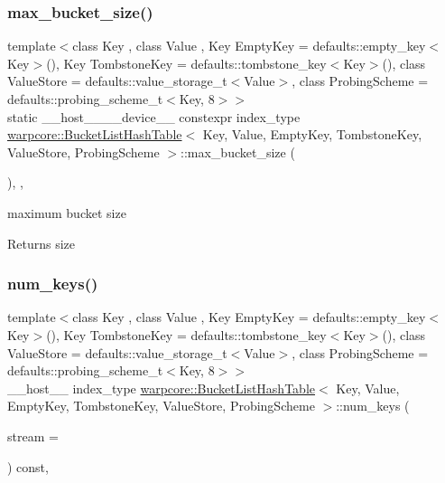 \subsubsection{\texorpdfstring{max\+\_\+bucket\+\_\+size()}{max\_bucket\_size()}}
{\footnotesize\ttfamily template$<$class Key , class Value , Key Empty\+Key = defaults\+::empty\+\_\+key$<$\+Key$>$(), Key Tombstone\+Key = defaults\+::tombstone\+\_\+key$<$\+Key$>$(), class Value\+Store  = defaults\+::value\+\_\+storage\+\_\+t$<$\+Value$>$, class Probing\+Scheme  = defaults\+::probing\+\_\+scheme\+\_\+t$<$\+Key, 8$>$$>$ \\
static \+\_\+\+\_\+host\+\_\+\+\_\+\+\_\+\+\_\+device\+\_\+\+\_\+ constexpr index\+\_\+type \hyperlink{classwarpcore_1_1BucketListHashTable}{warpcore\+::\+Bucket\+List\+Hash\+Table}$<$ Key, Value, Empty\+Key, Tombstone\+Key, Value\+Store, Probing\+Scheme $>$\+::max\+\_\+bucket\+\_\+size (\begin{DoxyParamCaption}{ }\end{DoxyParamCaption})\hspace{0.3cm}{\ttfamily [inline]}, {\ttfamily [static]}, {\ttfamily [noexcept]}}



maximum bucket size 

\begin{DoxyReturn}{Returns}
size 
\end{DoxyReturn}
\mbox{\label{classwarpcore_1_1BucketListHashTable_a6667de3a96ab1e7a1b26461eea6d4144}} 
\subsubsection{\texorpdfstring{num\+\_\+keys()}{num\_keys()}}
{\footnotesize\ttfamily template$<$class Key , class Value , Key Empty\+Key = defaults\+::empty\+\_\+key$<$\+Key$>$(), Key Tombstone\+Key = defaults\+::tombstone\+\_\+key$<$\+Key$>$(), class Value\+Store  = defaults\+::value\+\_\+storage\+\_\+t$<$\+Value$>$, class Probing\+Scheme  = defaults\+::probing\+\_\+scheme\+\_\+t$<$\+Key, 8$>$$>$ \\
\+\_\+\+\_\+host\+\_\+\+\_\+ index\+\_\+type \hyperlink{classwarpcore_1_1BucketListHashTable}{warpcore\+::\+Bucket\+List\+Hash\+Table}$<$ Key, Value, Empty\+Key, Tombstone\+Key, Value\+Store, Probing\+Scheme $>$\+::num\+\_\+keys (\begin{DoxyParamCaption}\item[{const cuda\+Stream\+\_\+t}]{stream = {} }\end{DoxyParamCaption}) const\hspace{0.3cm}{\ttfamily [inline]}, {\ttfamily [noexcept]}}



